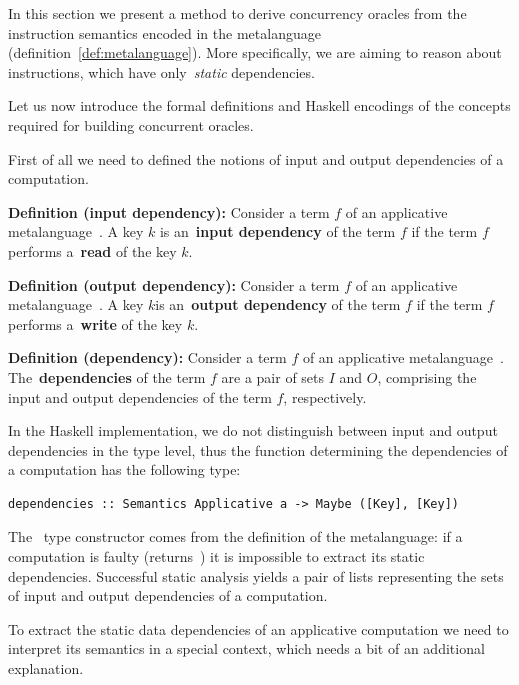 In this section we present a method to derive concurrency oracles from the instruction
semantics encoded in the  metalanguage (definition~\ref{def:metalanguage}).
More specifically, we are aiming to reason about instructions,
which have only~\emph{static} dependencies.

Let us now introduce the formal definitions and Haskell encodings of the concepts
required for building concurrent oracles.

First of all we need to defined the notions of input and output dependencies of
a computation.

\textbf{Definition (input dependency):\label{def:in-dependencies}}
Consider a term $f$ of an applicative metalanguage~. A key $k$
is an~\textbf{input dependency} of the term $f$ if the term $f$
performs a~\textbf{read} of the key $k$.

\textbf{Definition (output dependency):\label{def:out-dependencies}}
Consider a term $f$ of an applicative metalanguage~. A key $k$is
an~\textbf{output dependency} of the term $f$ if the term $f$
performs a~\textbf{write} of the key $k$.

\textbf{Definition (dependency):\label{def:dependencies}}
Consider a term $f$ of an applicative metalanguage~.
The~\textbf{dependencies} of the term $f$ are a pair of sets $I$ and $O$,
comprising the input and output dependencies of the term $f$, respectively.

In the Haskell implementation, we do not distinguish between input and output dependencies
in the type level, thus the function determining the dependencies of a computation
has the following type:

\begin{verbatim}
dependencies :: Semantics Applicative a -> Maybe ([Key], [Key])
\end{verbatim}

The~ type constructor comes from the definition of the metalanguage:
if a computation is faulty (returns~) it is impossible to extract
its static dependencies. Successful static analysis yields a pair of lists representing
the sets of input and output dependencies of a computation.

To extract the static data dependencies of an applicative computation we need to
interpret its semantics in a special context, which needs a bit of an additional
explanation.

\newpage

